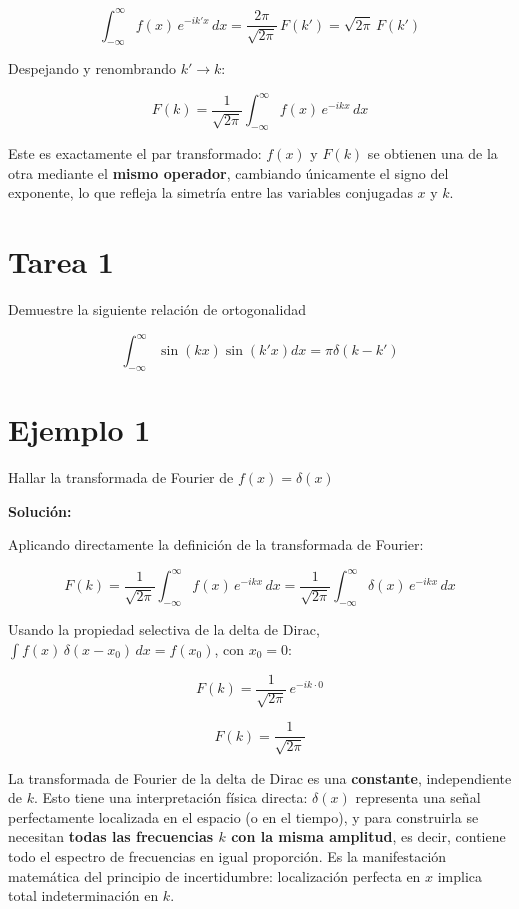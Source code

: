 \documentclass[a4paper]{article}
\begin{document}
$$\int_{-\infty}^{\infty} f(x)\, e^{-ik'x}\, dx = \frac{2\pi}{\sqrt{2\pi}}\, F(k') = \sqrt{2\pi}\, F(k')$$

Despejando y renombrando $k' \to k$:

$$\boxed{F(k) = \frac{1}{\sqrt{2\pi}}\int_{-\infty}^{\infty} f(x)\, e^{-ikx}\, dx}$$

Este es exactamente el par transformado: $f(x)$ y $F(k)$ se obtienen una de la otra mediante el \textbf{mismo operador}, cambiando únicamente el signo del exponente, lo que refleja la simetría entre las variables conjugadas $x$ y $k$.

\section{Tarea 1}

Demuestre la siguiente relación de ortogonalidad

$$\int_{-\infty}^{\infty}\sin(kx)\sin(k'x)dx=\pi\delta(k-k')$$

\section{Ejemplo 1}

Hallar la transformada de Fourier de $f(x) = \delta(x)$

\textbf{Solución:}

Aplicando directamente la definición de la transformada de Fourier:

$$F(k) = \frac{1}{\sqrt{2\pi}}\int_{-\infty}^{\infty} f(x)\, e^{-ikx}\, dx = \frac{1}{\sqrt{2\pi}}\int_{-\infty}^{\infty} \delta(x)\, e^{-ikx}\, dx$$

Usando la propiedad selectiva de la delta de Dirac, $\int f(x)\,\delta(x - x_0)\,dx = f(x_0)$, con $x_0 = 0$:

$$F(k) = \frac{1}{\sqrt{2\pi}}\, e^{-ik\cdot 0}$$

$$\boxed{F(k) = \frac{1}{\sqrt{2\pi}}}$$

La transformada de Fourier de la delta de Dirac es una \textbf{constante}, independiente de $k$. Esto tiene una interpretación física directa: $\delta(x)$ representa una señal perfectamente localizada en el espacio (o en el tiempo), y para construirla se necesitan \textbf{todas las frecuencias $k$ con la misma amplitud}, es decir, contiene todo el espectro de frecuencias en igual proporción. Es la manifestación matemática del principio de incertidumbre: localización perfecta en $x$ implica total indeterminación en $k$.
\end{document}
